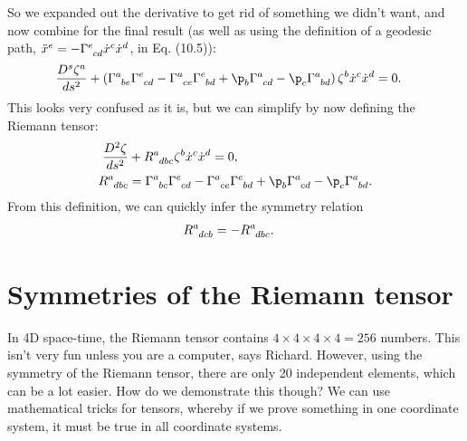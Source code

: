 \documentclass[a4paper, 11pt, normalem]{report}
\begin{document}
So we expanded out the derivative to get rid of something we didn't want, and now combine for the final result (as well as using the definition of a geodesic path, $\ddot{x}^e=-\tensor{\Gamma}{^e_{cd}}\dot{x}^c\dot{x}^d$, in Eq. (10.5)):
\begin{align}
    \frac{D^s\zeta^a}{ds^2} &+ \left(\tensor{\Gamma}{^a_{be}}\tensor{\Gamma}{^e_{cd}}-\tensor{\Gamma}{^a_{ce}}\tensor{\Gamma}{^e_{bd}}+\p_b\tensor{\Gamma}{^a_{cd}}-\p_c\tensor{\Gamma}{^a_{bd}}\right)\zeta^b\dot{x}^c\dot{x}^d = 0.
\end{align}
This looks very confused as it is, but we can simplify by now defining the Riemann tensor:
\begin{align}
    \frac{D^2\zeta}{ds^2} &+ \tensor{R}{^a_{dbc}}\zeta^b\dot{x}^c\dot{x}^d = 0,\\
    \tensor{R}{^a_{dbc}} &= \tensor{\Gamma}{^a_{bc}}\tensor{\Gamma}{^e_{cd}} - \tensor{\Gamma}{^a_{ce}}\tensor{\Gamma}{^e_{bd}} + \p_b\tensor{\Gamma}{^a_{cd}}-\p_c\tensor{\Gamma}{^a_{bd}}.
\end{align}
From this definition, we can quickly infer the symmetry relation
\begin{align}
    \tensor{R}{^a_{dcb}} &= -\tensor{R}{^a_{dbc}}.
\end{align}

\section{Symmetries of the Riemann tensor}
In 4D space-time, the Riemann tensor contains $4\times4\times4\times4 = 256$ numbers.
This isn't very fun unless you are a computer, says Richard.
However, using the symmetry of the Riemann tensor, there are only 20 independent elements, which can be a lot easier.
How do we demonstrate this though?
We can use mathematical tricks for tensors, whereby if we prove something in one coordinate system, it must be true in all coordinate systems.
\end{document}
